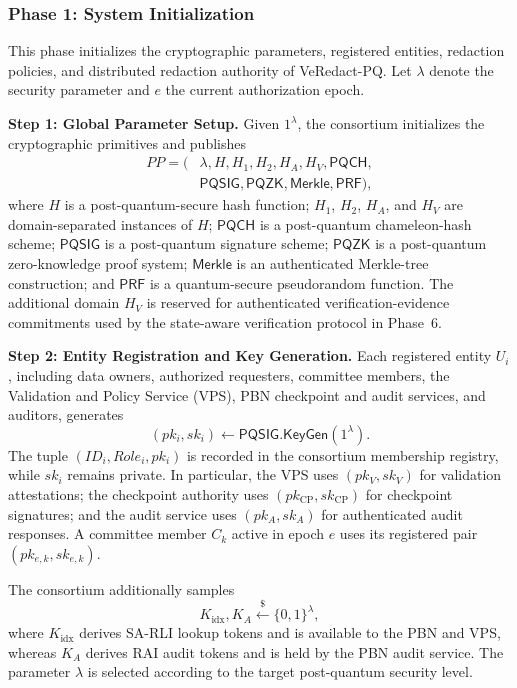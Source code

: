 \documentclass[lettersize,journal]{IEEEtran}
\begin{document}
    \subsubsection*{\textbf{Phase 1: System Initialization}}

This phase initializes the cryptographic parameters, registered
entities, redaction policies, and distributed redaction authority of
VeRedact-PQ. Let $\lambda$ denote the security parameter and $e$ the
current authorization epoch.

\textbf{Step 1: Global Parameter Setup.}
Given $1^\lambda$, the consortium initializes the cryptographic
primitives and publishes
\begin{equation}
\begin{aligned}
PP=(&\lambda,H,H_1,H_2,H_A,H_V,\mathsf{PQCH},\\
&\mathsf{PQSIG},\mathsf{PQZK},\mathsf{Merkle},\mathsf{PRF}),
\end{aligned}
\end{equation}
where $H$ is a post-quantum-secure hash function;
$H_1$, $H_2$, $H_A$, and $H_V$ are domain-separated instances of
$H$; $\mathsf{PQCH}$ is a post-quantum chameleon-hash scheme;
$\mathsf{PQSIG}$ is a post-quantum signature scheme;
$\mathsf{PQZK}$ is a post-quantum zero-knowledge proof system;
$\mathsf{Merkle}$ is an authenticated Merkle-tree construction; and
$\mathsf{PRF}$ is a quantum-secure pseudorandom function.
The additional domain $H_V$ is reserved for authenticated
verification-evidence commitments used by the state-aware verification
protocol in Phase~6.

\textbf{Step 2: Entity Registration and Key Generation.}
Each registered entity $U_i$, including data owners, authorized
requesters, committee members, the Validation and Policy Service
(VPS), PBN checkpoint and audit services, and auditors, generates
\begin{equation}
(pk_i,sk_i)\leftarrow
\mathsf{PQSIG.KeyGen}(1^\lambda).
\end{equation}
The tuple $(ID_i,Role_i,pk_i)$ is recorded in the consortium membership
registry, while $sk_i$ remains private. In particular, the VPS uses
$(pk_V,sk_V)$ for validation attestations; the checkpoint authority uses
$(pk_{\mathrm{CP}},sk_{\mathrm{CP}})$ for checkpoint signatures; and the
audit service uses $(pk_A,sk_A)$ for authenticated audit responses.
A committee member $C_k$ active in epoch $e$ uses its registered pair
$(pk_{e,k},sk_{e,k})$.

The consortium additionally samples
\begin{equation}
K_{\mathrm{idx}},K_A
\stackrel{\$}{\leftarrow}\{0,1\}^{\lambda},
\end{equation}
where $K_{\mathrm{idx}}$ derives SA-RLI lookup tokens and is available
to the PBN and VPS, whereas $K_A$ derives RAI audit tokens and is held
by the PBN audit service. The parameter $\lambda$ is selected according
to the target post-quantum security level.
\end{document}
